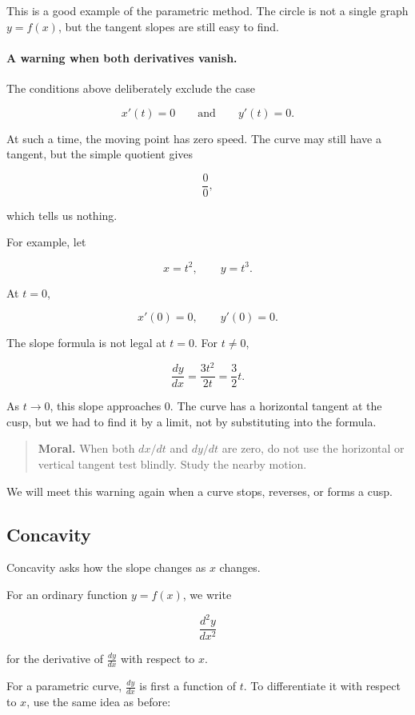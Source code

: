 This is a good example of the parametric method.  The circle is not a single graph
\(y=f(x)\), but the tangent slopes are still easy to find.

\paragraph{A warning when both derivatives vanish.}
The conditions above deliberately exclude the case

\[
x'(t)=0
\qquad\text{and}\qquad
y'(t)=0.
\]

At such a time, the moving point has zero speed.  The curve may still have a tangent,
but the simple quotient gives

\[
\frac{0}{0},
\]

which tells us nothing.

For example, let

\[
x=t^2,
\qquad
y=t^3.
\]

At \(t=0\),

\[
x'(0)=0,
\qquad
y'(0)=0.
\]

The slope formula is not legal at \(t=0\).  For \(t\neq0\),

\[
\frac{dy}{dx}
=
\frac{3t^2}{2t}
=
\frac32t.
\]

As \(t\to0\), this slope approaches \(0\).  The curve has a horizontal tangent at the
cusp, but we had to find it by a limit, not by substituting into the formula.

\begin{quote}
\textbf{Moral.}
When both \(dx/dt\) and \(dy/dt\) are zero, do not use the horizontal or vertical tangent
test blindly.  Study the nearby motion.
\end{quote}

We will meet this warning again when a curve stops, reverses, or forms a cusp.

\subsection{Concavity}
\label{subsec:parametric-concavity}

Concavity asks how the slope changes as \(x\) changes.

For an ordinary function \(y=f(x)\), we write

\[
\frac{d^2y}{dx^2}
\]

for the derivative of \(\frac{dy}{dx}\) with respect to \(x\).

For a parametric curve, \(\frac{dy}{dx}\) is first a function of \(t\).  To differentiate it
with respect to \(x\), use the same idea as before:

